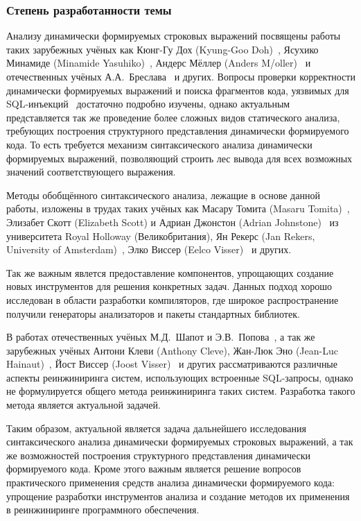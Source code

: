 \subsubsection*{\large{Степень разработанности темы}}

Анализу динамически формируемых строковых выражений посвящены работы таких зарубежных учёных как Кюнг-Гу Дох (Kyung-Goo Doh)~\cite{LrAbstract1,LrAbstract2,LRAbstractParsingSema}, Ясухико Минамиде (Minamide Yasuhiko)~\cite{PHPSA}, Андерс Мёллер (Anders M/oller)~\cite{JSA} и отечественных учёных А.А.~Бреслава~\cite{Alvor1,Alvor2} и других. Вопросы проверки корректности динамически формируемых выражений и поиска фрагментов кода, уязвимых для SQL-инъекций~\cite{SQLInjection,Dasgupta:2009:SAF:1546683.1547548} достаточно подробно изучены, однако актуальным представляется так же проведение более сложных видов статического анализа, требующих построения структурного представления динамически формируемого кода. То есть требуется механизм синтаксического анализа динамически формируемых выражений, позволяющий строить лес вывода для всех возможных значений соответствующего выражения. 

Методы обобщённого синтаксического анализа, лежащие в основе данной работы, изложены в трудах таких учёных как Масару Томита (Masaru Tomita)~\cite{Tomita}, Элизабет Скотт (Elizabeth Scott) и Адриан Джонстон (Adrian Johnstone)~\cite{RNGLR,RIGLR} из университета Royal Holloway (Великобритания), Ян Рекерс (Jan Rekers, University of Amsterdam)~\cite{SPPF}, Элко Виссер (Eelco Visser)~\cite{RNGLRSyntaxerror2,RNGLRSyntaxerror3} и других.

Так же важным явлется предоставление компонентов, упрощающих создание новых инструментов для решения конкретных задач. Данных подход хорошо исследован в области разработки компиляторов, где широкое распространение получили генераторы анализаторов и пакеты стандартных библиотек. 

В работах отечественных учёных М.Д.~Шапот и Э.В.~Попова~\cite{DynamicDSQLTranslation}, а так же зарубежных учёных Антони Клеви (Anthony Cleve), Жан-Люк Эно (Jean-Luc Hainaut)~\cite{DSQLReverseEngineering}, Йост Виссер (Joost Visser)~\cite{DSQLQualityMesure} и других рассматриваются различные аспекты реинжиниринга систем, использующих встроенные SQL-запросы, однако не формулируется общего метода реинжиниринга таких систем. Разработка такого метода является актуальной задачей.

Таким образом, актуальной является задача дальнейшего исследования синтаксического анализа динамически формируемых строковых выражений, а так же возможностей построения структурного представления динамически формируемого кода. Кроме этого важным является решение вопросов практического применения средств анализа динамически формируемого кода: упрощение разработки инструментов анализа и создание методов их применения в реинжиниринге программного обеспечения.

